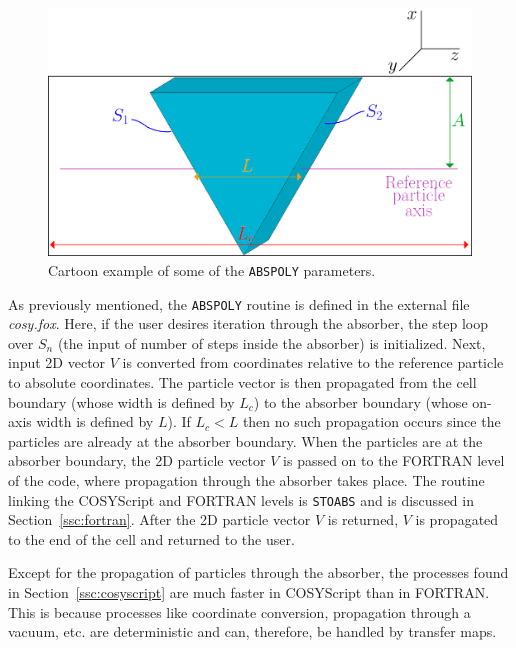 \begin{figure}[!htb]
  \centering
    \includegraphics[width=\textwidth]{Figures/abspoly} 
  \caption{Cartoon example of some of the \texttt{ABSPOLY} parameters.}
  \label{fig:abspoly}
\end{figure}

\label{ssc:cosyscript}

As previously mentioned, the \texttt{ABSPOLY} routine is defined in the external file \textit{cosy.fox}. Here, if the user desires iteration through the absorber, the step loop over $S_n$ (the input of number of steps inside the absorber) is initialized. Next, input 2D vector $V$ is converted from coordinates relative to the reference particle to absolute coordinates. The particle vector is then propagated from the cell boundary (whose width is defined by $L_c$) to the absorber boundary (whose on-axis width is defined by $L$). If $L_c<L$ then no such propagation occurs since the particles are already at the absorber boundary. When the particles are at the absorber boundary, the 2D particle vector $V$ is passed on to the FORTRAN level of the code, where propagation through the absorber takes place. The routine linking the COSYScript and FORTRAN levels is \texttt{STOABS} and is discussed in Section~\ref{ssc:fortran}. After the 2D particle vector $V$ is returned, $V$ is propagated to the end of the cell and returned to the user.

\label{ssc:fortran}

Except for the propagation of particles through the absorber, the processes found in Section~\ref{ssc:cosyscript} are much faster in COSYScript than in FORTRAN. This is because processes like coordinate conversion, propagation through a vacuum, etc. are deterministic and can, therefore, be handled by transfer maps.

